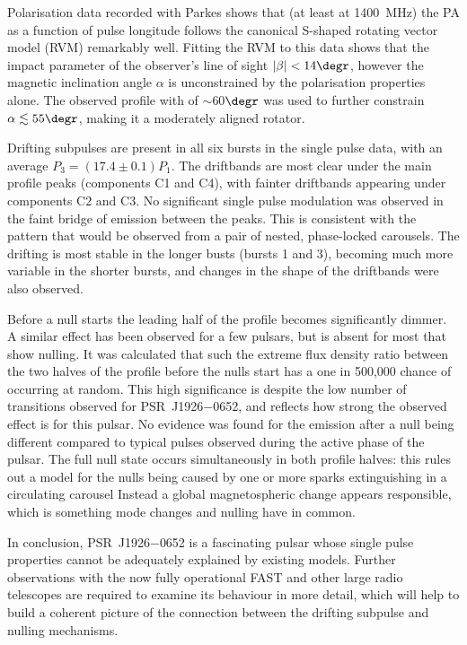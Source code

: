 Polarisation data recorded with Parkes shows that (at least at 1400~MHz) the PA as a function of pulse longitude follows the canonical S-shaped rotating vector model (RVM) remarkably well. Fitting the RVM to this data shows that the impact parameter of the observer's line of sight $|\beta| < 14\degr$, however the magnetic inclination angle $\alpha$ is unconstrained by the polarisation properties alone. The observed profile with of $\sim$60$\degr$ was used to further constrain $\alpha \lesssim 55\degr$, making it a moderately aligned rotator.

Drifting subpulses are present in all six bursts in the single pulse data, with an average $P_3 = (17.4\pm 0.1) P_1$. The driftbands are most clear under the main profile peaks (components C1 and C4), with fainter driftbands appearing under components C2 and C3. No significant single pulse modulation was observed in the faint bridge of emission between the peaks. This is consistent with the pattern that would be observed from a pair of nested, phase-locked carousels. The drifting is most stable in the longer busts (bursts 1 and 3), becoming much more variable in the shorter bursts, and changes in the shape of the driftbands were also observed. 

Before a null starts the leading half of the profile becomes significantly dimmer. A similar effect has been observed for a few pulsars, but is absent for most that show nulling. It was calculated that such the extreme flux density ratio between the two halves of the profile before the nulls start has a one in 500,000 chance of occurring at random. This high significance is despite the low number of transitions observed for PSR~J1926$-$0652, and reflects how strong the observed effect is for this pulsar. No evidence was found for the emission after a null being different compared to typical pulses observed during the active phase of the pulsar. The full null state occurs simultaneously in both profile halves: this rules out a model for the nulls being caused by one or more sparks extinguishing in a circulating carousel \citep[e.g.][]{RWxx2008}Instead a global magnetospheric change appears responsible, which is something mode changes and nulling have in common.

In conclusion, PSR~J1926$-$0652 is a fascinating pulsar whose single pulse properties cannot be adequately explained by existing models. Further observations with the now fully operational FAST and other large radio telescopes are required to examine its behaviour in more detail, which will help to build a coherent picture of the connection between the drifting subpulse and nulling mechanisms. 